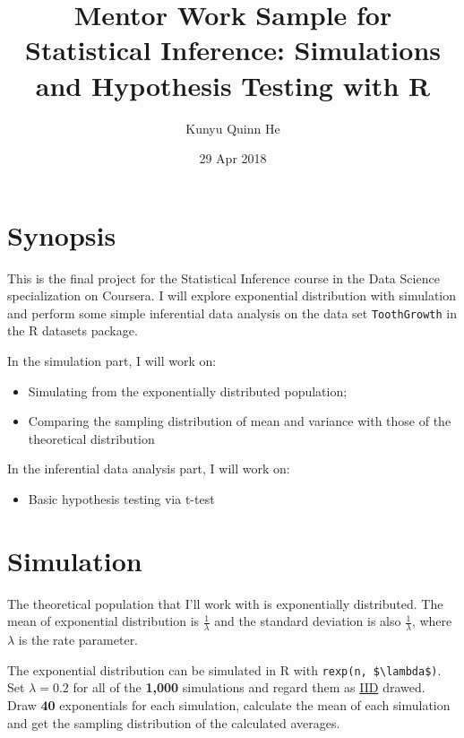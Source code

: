 \documentclass[]{article}
\title{Mentor Work Sample for Statistical Inference: Simulations and Hypothesis
Testing with R}
\author{Kunyu Quinn He}
\date{29 Apr 2018}
\providecommand{\tightlist}{%
  \setlength{\itemsep}{0pt}\setlength{\parskip}{0pt}}
\begin{document}
\maketitle

\section{Synopsis}\label{synopsis}

This is the final project for the Statistical Inference course in the
Data Science specialization on Coursera. I will explore exponential
distribution with simulation and perform some simple inferential data
analysis on the data set \texttt{ToothGrowth} in the R datasets package.

In the simulation part, I will work on:

\begin{itemize}
\tightlist
\item
  Simulating from the exponentially distributed population;
\item
  Comparing the sampling distribution of mean and variance with those of
  the theoretical distribution
\end{itemize}

In the inferential data analysis part, I will work on:

\begin{itemize}
\tightlist
\item
  Basic hypothesis testing via t-test
\end{itemize}

\section{Simulation}\label{simulation}

The theoretical population that I'll work with is exponentially
distributed. The mean of exponential distribution is
\(\frac{1}{\lambda}\) and the standard deviation is also
\(\frac{1}{\lambda}\), where \(\lambda\) is the rate parameter.

The exponential distribution can be simulated in R with
\texttt{rexp(n,\ \$\textbackslash{}lambda\$)}. Set
\textbf{\(\lambda=0.2\)} for all of the \textbf{1,000} simulations and
regard them as
\href{https://en.wikipedia.org/wiki/Independent_and_identically_distributed_random_variables}{IID}
drawed. Draw \textbf{40} exponentials for each simulation, calculate the
mean of each simulation and get the sampling distribution of the
calculated averages.
\end{document}
